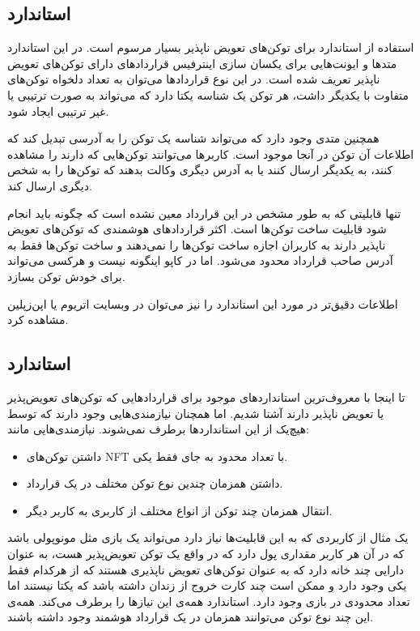 \subsection{استاندارد }
استفاده از استاندارد
برای توکن‌های تعویض ناپذیر بسیار مرسوم است. در این استاندارد متدها و ایونت‌هایی برای یکسان سازی اینترفیس قراردادهای دارای توکن‌های تعویض ناپذیر تعریف شده است. در این نوع قرارداد‌ها می‌توان به تعداد دلخواه توکن‌های متفاوت با یکدیگر داشت، هر توکن یک شناسه یکتا دارد که می‌تواند به صورت ترتیبی یا غیر ترتیبی ایجاد شود.

همچنین متدی وجود دارد که می‌تواند شناسه یک توکن را به آدرسی تبدیل کند که اطلاعات آن توکن در آنجا موجود است. کاربرها می‌توانند توکن‌هایی که دارند را مشاهده کنند، به یکدیگر ارسال کنند یا به آدرس دیگری وکالت بدهند که توکن‌ها را به شخص دیگری ارسال کند.

تنها قابلیتی که به طور مشخص در این قرارداد معین نشده است که چگونه باید انجام شود قابلیت ساخت توکن‌ها است. اکثر قراردادهای هوشمندی که توکن‌های تعویض ناپذیر دارند به کاربران اجازه ساخت توکن‌ها را نمی‌دهند و ساخت توکن‌ها فقط به آدرس صاحب قرارداد محدود می‌شود. اما در کاپو اینگونه نیست و هرکسی می‌تواند برای خودش توکن بسازد.

اطلاعات دقیق‌تر در مورد این استاندارد را نیز می‌توان در وبسایت
اتریوم
یا
اپن‌زپلین
مشاهده کرد.


\subsection{استاندارد }
تا اینجا با معروف‌ترین استاندارد‌های موجود برای قراردادهایی که توکن‌های تعویض‌پذیر یا تعویض ناپذیر دارند آشنا شدیم. اما همچنان نیازمندی‌هایی وجود دارند که توسط هیچ‌یک از این استانداردها برطرف نمی‌شوند. نیازمندی‌هایی مانند:
\begin{itemize}
	\item
داشتن توکن‌های NFT با تعداد محدود به جای فقط یکی.
	\item
داشتن همزمان چندین نوع توکن مختلف در یک قرارداد.
	\item
انتقال همزمان چند توکن از انواع مختلف از کاربری به کاربر دیگر.
\end{itemize}

یک مثال از کاربردی که به این قابلیت‌ها نیاز دارد می‌تواند یک بازی مثل مونوپولی باشد که در آن هر کاربر مقداری پول دارد که در واقع یک توکن تعویض‌پذیر هست، به عنوان دارایی چند خانه دارد که به عنوان توکن‌های تعویض ناپذیری هستند که از هرکدام فقط یکی وجود دارد و ممکن است چند کارت خروج از زندان داشته باشد که یکتا نیستند اما تعداد محدودی در بازی وجود دارد. استاندارد
همه‌ی این نیازها را برطرف می‌کند. همه‌ی این چند نوع توکن می‌توانند همزمان در یک قرارداد هوشمند وجود داشته باشند.

